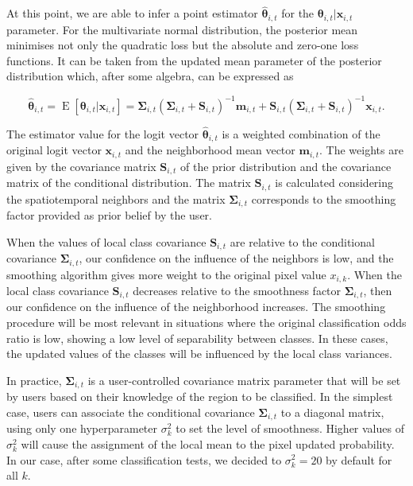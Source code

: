 \documentclass[
  11pt,
]{report}
\begin{document}
At this point, we are able to infer a point estimator
\(\hat{\boldsymbol\theta}_{i,t}\) for the
\(\boldsymbol\theta_{i,t}|\mathbf{x}_{i,t}\) parameter. For the
multivariate normal distribution, the posterior mean minimises not only
the quadratic loss but the absolute and zero-one loss functions. It can
be taken from the updated mean parameter of the posterior distribution
which, after some algebra, can be expressed as

\[
    \hat{\boldsymbol{\theta}}_{i,t}=\operatorname{E}[\boldsymbol\theta_{i,t}|\mathbf{x}_{i,t}]=\boldsymbol\Sigma_{i,t}\left(\boldsymbol\Sigma_{i,t}+\mathbf{S}_{i,t}\right)^{-1}\mathbf{m}_{i,t} +
    \mathbf{S}_{i,t}\left(\boldsymbol\Sigma_{i,t}+\mathbf{S}_{i,t}\right)^{-1}\mathbf{x}_{i,t}.
\]

The estimator value for the logit vector
\(\hat{\boldsymbol\theta}_{i,t}\) is a weighted combination of the
original logit vector \(\mathbf{x}_{i,t}\) and the neighborhood mean
vector \(\mathbf{m}_{i,t}\). The weights are given by the covariance
matrix \(\mathbf{S}_{i,t}\) of the prior distribution and the covariance
matrix of the conditional distribution. The matrix \(\mathbf{S}_{i,t}\)
is calculated considering the spatiotemporal neighbors and the matrix
\(\boldsymbol\Sigma_{i,t}\) corresponds to the smoothing factor provided
as prior belief by the user.

When the values of local class covariance \(\mathbf{S}_{i,t}\) are
relative to the conditional covariance \(\boldsymbol\Sigma_{i,t}\), our
confidence on the influence of the neighbors is low, and the smoothing
algorithm gives more weight to the original pixel value \(x_{i,k}\).
When the local class covariance \(\mathbf{S}_{i,t}\) decreases relative
to the smoothness factor \(\boldsymbol\Sigma_{i,t}\), then our
confidence on the influence of the neighborhood increases. The smoothing
procedure will be most relevant in situations where the original
classification odds ratio is low, showing a low level of separability
between classes. In these cases, the updated values of the classes will
be influenced by the local class variances.

In practice, \(\boldsymbol\Sigma_{i,t}\) is a user-controlled covariance
matrix parameter that will be set by users based on their knowledge of
the region to be classified. In the simplest case, users can associate
the conditional covariance \(\boldsymbol\Sigma_{i,t}\) to a diagonal
matrix, using only one hyperparameter \(\sigma^2_k\) to set the level of
smoothness. Higher values of \(\sigma^2_k\) will cause the assignment of
the local mean to the pixel updated probability. In our case, after some
classification tests, we decided to \(\sigma^2_k=20\) by default for all
\(k\).
\end{document}
